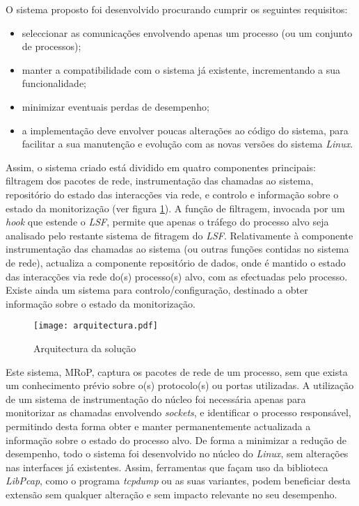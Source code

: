 O sistema proposto foi desenvolvido procurando cumprir os seguintes requisitos:
\begin{itemize}
\item seleccionar as comunicações envolvendo apenas um processo (ou um conjunto de processos);
\item manter a compatibilidade com o sistema já existente, incrementando a sua funcionalidade;
\item minimizar eventuais perdas de desempenho;
\item a implementação deve envolver poucas alterações ao código do sistema, para facilitar a sua manutenção e evolução com as novas versões do sistema \textit{Linux}.
\end{itemize}

Assim, o sistema criado está dividido em quatro componentes principais: filtragem dos pacotes de rede, instrumentação das chamadas ao sistema, repositório do estado das interacções via rede, e controlo e informação sobre o estado da monitorização (ver figura \ref{arquitectura}).
A função de filtragem, invocada por um \textit{hook} que estende o \textit{LSF}, permite que apenas o tráfego do processo alvo seja analisado pelo restante sistema de fitragem do \textit{LSF}.
Relativamente à componente instrumentação das chamadas ao sistema (ou outras funções contidas no sistema de rede), actualiza a componente repositório de dados, onde é mantido o estado das interacções via rede do(s) processo(s) alvo, com as efectuadas pelo processo.
Existe ainda um sistema para controlo/configuração, destinado a obter informação sobre o estado da monitorização.

\begin{figure}[htbp]
\begin{center}
\texttt{[image: arquitectura.pdf]} 
\caption{Arquitectura da solução}
\label{arquitectura}
\end{center}
\end{figure}

Este sistema, MRoP, captura os pacotes de rede de um processo, sem que exista um conhecimento prévio sobre o(s) protocolo(s) ou portas utilizadas.
A utilização de um sistema de instrumentação do núcleo foi necessária apenas para monitorizar as chamadas envolvendo \emph{sockets}, e identificar o processo responsável, permitindo desta forma obter e manter permanentemente actualizada a informação sobre o estado do processo alvo.
De forma a minimizar a redução de desempenho, todo o sistema foi desenvolvido no núcleo do \textit{Linux}, sem alterações nas interfaces já existentes.
Assim, ferramentas que façam uso da biblioteca \textit{LibPcap}, como o programa \textit{tcpdump} ou as suas variantes, podem beneficiar desta extensão sem qualquer alteração e sem impacto relevante no seu desempenho.

